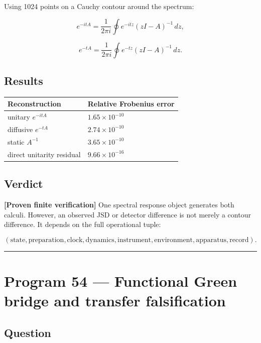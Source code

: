 \documentclass[11pt,a4paper,openany]{report}
\begin{document}
Using 1024 points on a Cauchy contour around the spectrum:

\[
e^{-itA}
=
\frac{1}{2\pi i}\oint e^{-itz}(zI-A)^{-1}\,dz,
\]

\[
e^{-tA}
=
\frac{1}{2\pi i}\oint e^{-tz}(zI-A)^{-1}\,dz.
\]

\section{Results}

\begin{center}
\begingroup\small
\setlength{\tabcolsep}{3.5pt}
\renewcommand{\arraystretch}{1.16}
\begin{longtable}{@{}p{}p{}@{}}
\toprule
\textbf{Reconstruction} & \textbf{Relative Frobenius error} \\
\midrule
\endhead
unitary \(e^{-itA}\) & \(1.65\times10^{-10}\) \\
diffusive \(e^{-tA}\) & \(2.74\times10^{-10}\) \\
static \(A^{-1}\) & \(3.65\times10^{-10}\) \\
direct unitarity residual & \(9.66\times10^{-16}\) \\
\bottomrule
\end{longtable}
\endgroup
\end{center}

\section{Verdict}

\textbf{[Proven finite verification]} One spectral response object generates both calculi. However, an observed JSD or detector difference is not merely a contour difference. It depends on the full operational tuple:

\[
(\text{state},\text{preparation},\text{clock},\text{dynamics},
\text{instrument},\text{environment},\text{apparatus},\text{record}).
\]

\par\medskip\hrule\medskip

\chapter{Program 54 — Functional Green bridge and transfer falsification}

\section{Question}
\end{document}
